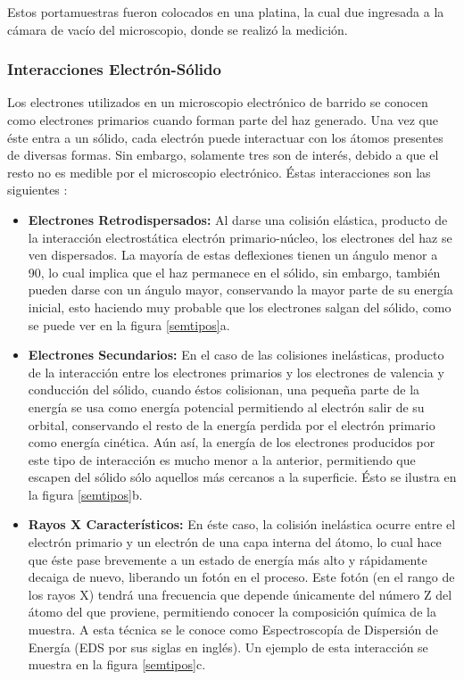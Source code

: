 \documentclass[../main.tex]{subfiles}
\begin{document}
Estos portamuestras fueron colocados en una platina, la cual due ingresada a la cámara de vacío del microscopio, donde se realizó la medición. 

\subsubsection{Interacciones Electrón-Sólido}
Los electrones utilizados en un microscopio electrónico de barrido se conocen como electrones primarios cuando forman parte del haz generado. Una vez que éste entra a un sólido, cada electrón puede interactuar con los átomos presentes de diversas formas. Sin embargo, solamente tres son de interés, debido a que el resto no es medible por el microscopio electrónico. Éstas interacciones son las siguientes \cite{Egerton2005}:
\begin{itemize}
    \item  \textbf{Electrones Retrodispersados:} Al darse una colisión elástica, producto de la interacción electrostática electrón primario-núcleo, los electrones del haz se ven dispersados. La mayoría de estas deflexiones tienen un ángulo menor a 90\grado, lo cual implica que el haz permanece en el sólido, sin embargo, también pueden darse con un ángulo mayor, conservando la mayor parte de su energía inicial, esto haciendo muy probable que los electrones salgan del sólido, como se puede ver en la figura \ref{semtipos}a.
    \item \textbf{Electrones Secundarios:} En el caso de las colisiones inelásticas, producto de la interacción entre los electrones primarios y los electrones de valencia y conducción del sólido, cuando éstos colisionan, una pequeña parte de la energía se usa como energía potencial permitiendo al electrón salir de su orbital, conservando el resto de la energía perdida por el electrón primario como energía cinética. Aún así, la energía de los electrones producidos por este tipo de interacción es mucho menor a la anterior, permitiendo que escapen del sólido sólo aquellos más cercanos a la superficie. Ésto se ilustra en la figura \ref{semtipos}b.
    \item \textbf{Rayos X Característicos:} En éste caso, la colisión inelástica ocurre entre el electrón primario y un electrón de una capa interna del átomo, lo cual hace que éste pase brevemente a un estado de energía más alto y rápidamente decaiga de nuevo, liberando un fotón en el proceso. Este fotón (en el rango de los rayos X) tendrá una frecuencia que depende únicamente del número Z del átomo del que proviene, permitiendo conocer la composición química de la muestra. A esta técnica se le conoce como Espectroscopía de Dispersión de Energía (EDS por sus siglas en inglés). Un ejemplo de esta interacción se muestra en la figura \ref{semtipos}c.
\end{itemize}
\end{document}
